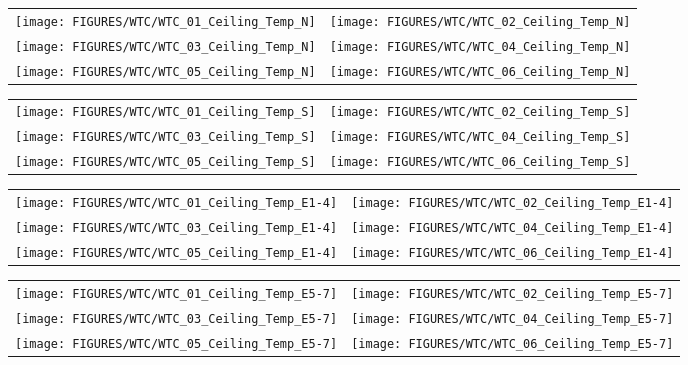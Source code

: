 \newpage

\begin{figure}[p]
\begin{tabular*}{\textwidth}{l@{\extracolsep{\fill}}r}
\texttt{[image: FIGURES/WTC/WTC\_01\_Ceiling\_Temp\_N]} &
\texttt{[image: FIGURES/WTC/WTC\_02\_Ceiling\_Temp\_N]} \\
\texttt{[image: FIGURES/WTC/WTC\_03\_Ceiling\_Temp\_N]} &
\texttt{[image: FIGURES/WTC/WTC\_04\_Ceiling\_Temp\_N]} \\
\texttt{[image: FIGURES/WTC/WTC\_05\_Ceiling\_Temp\_N]} &
\texttt{[image: FIGURES/WTC/WTC\_06\_Ceiling\_Temp\_N]}
\end{tabular*}
\label{NIST_WTC_Ceiling_N}
\end{figure}

\begin{figure}[p]
\begin{tabular*}{\textwidth}{l@{\extracolsep{\fill}}r}
\texttt{[image: FIGURES/WTC/WTC\_01\_Ceiling\_Temp\_S]} &
\texttt{[image: FIGURES/WTC/WTC\_02\_Ceiling\_Temp\_S]} \\
\texttt{[image: FIGURES/WTC/WTC\_03\_Ceiling\_Temp\_S]} &
\texttt{[image: FIGURES/WTC/WTC\_04\_Ceiling\_Temp\_S]} \\
\texttt{[image: FIGURES/WTC/WTC\_05\_Ceiling\_Temp\_S]} &
\texttt{[image: FIGURES/WTC/WTC\_06\_Ceiling\_Temp\_S]}
\end{tabular*}
\label{NIST_WTC_Ceiling_S}
\end{figure}

\begin{figure}[p]
\begin{tabular*}{\textwidth}{l@{\extracolsep{\fill}}r}
\texttt{[image: FIGURES/WTC/WTC\_01\_Ceiling\_Temp\_E1-4]} &
\texttt{[image: FIGURES/WTC/WTC\_02\_Ceiling\_Temp\_E1-4]} \\
\texttt{[image: FIGURES/WTC/WTC\_03\_Ceiling\_Temp\_E1-4]} &
\texttt{[image: FIGURES/WTC/WTC\_04\_Ceiling\_Temp\_E1-4]} \\
\texttt{[image: FIGURES/WTC/WTC\_05\_Ceiling\_Temp\_E1-4]} &
\texttt{[image: FIGURES/WTC/WTC\_06\_Ceiling\_Temp\_E1-4]}
\end{tabular*}
\label{NIST_WTC_Ceiling_E1-4}
\end{figure}

\begin{figure}[p]
\begin{tabular*}{\textwidth}{l@{\extracolsep{\fill}}r}
\texttt{[image: FIGURES/WTC/WTC\_01\_Ceiling\_Temp\_E5-7]} &
\texttt{[image: FIGURES/WTC/WTC\_02\_Ceiling\_Temp\_E5-7]} \\
\texttt{[image: FIGURES/WTC/WTC\_03\_Ceiling\_Temp\_E5-7]} &
\texttt{[image: FIGURES/WTC/WTC\_04\_Ceiling\_Temp\_E5-7]} \\
\texttt{[image: FIGURES/WTC/WTC\_05\_Ceiling\_Temp\_E5-7]} &
\texttt{[image: FIGURES/WTC/WTC\_06\_Ceiling\_Temp\_E5-7]}
\end{tabular*}
\label{NIST_WTC_Ceiling_E5-7}
\end{figure}

